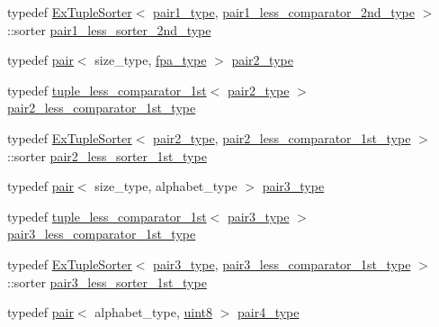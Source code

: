 \begin{DoxyCompactItemize}
\item 
typedef \hyperlink{struct_ex_tuple_sorter}{Ex\+Tuple\+Sorter}$<$ \hyperlink{class_validate4_aaa2fcb80a05115eb4ca02ab23df8827e}{pair1\+\_\+type}, \hyperlink{class_validate4_a67166f1b6f64e5d8887d9a5aa6072346}{pair1\+\_\+less\+\_\+comparator\+\_\+2nd\+\_\+type} $>$\+::sorter \hyperlink{class_validate4_a65355c8a8ccca4870060305479e7748c}{pair1\+\_\+less\+\_\+sorter\+\_\+2nd\+\_\+type}
\item 
typedef \hyperlink{structpair}{pair}$<$ size\+\_\+type, \hyperlink{common_8h_a7fdaf8b9b3d2f6ae6b10597a8d3f96ee}{fpa\+\_\+type} $>$ \hyperlink{class_validate4_a655c0013e7d26a0653ab8f4f96145bad}{pair2\+\_\+type}
\item 
typedef \hyperlink{structtuple__less__comparator__1st}{tuple\+\_\+less\+\_\+comparator\+\_\+1st}$<$ \hyperlink{class_validate4_a655c0013e7d26a0653ab8f4f96145bad}{pair2\+\_\+type} $>$ \hyperlink{class_validate4_af39ac6db5faa77a64ab49a75f92337a3}{pair2\+\_\+less\+\_\+comparator\+\_\+1st\+\_\+type}
\item 
typedef \hyperlink{struct_ex_tuple_sorter}{Ex\+Tuple\+Sorter}$<$ \hyperlink{class_validate4_a655c0013e7d26a0653ab8f4f96145bad}{pair2\+\_\+type}, \hyperlink{class_validate4_af39ac6db5faa77a64ab49a75f92337a3}{pair2\+\_\+less\+\_\+comparator\+\_\+1st\+\_\+type} $>$\+::sorter \hyperlink{class_validate4_ad945003027abfd152a0e177d7541580d}{pair2\+\_\+less\+\_\+sorter\+\_\+1st\+\_\+type}
\item 
typedef \hyperlink{structpair}{pair}$<$ size\+\_\+type, alphabet\+\_\+type $>$ \hyperlink{class_validate4_ac023757abc671597cf81dcc2d70b1ab1}{pair3\+\_\+type}
\item 
typedef \hyperlink{structtuple__less__comparator__1st}{tuple\+\_\+less\+\_\+comparator\+\_\+1st}$<$ \hyperlink{class_validate4_ac023757abc671597cf81dcc2d70b1ab1}{pair3\+\_\+type} $>$ \hyperlink{class_validate4_a12c8c95c3ef8bf9f3521b439454c5aa0}{pair3\+\_\+less\+\_\+comparator\+\_\+1st\+\_\+type}
\item 
typedef \hyperlink{struct_ex_tuple_sorter}{Ex\+Tuple\+Sorter}$<$ \hyperlink{class_validate4_ac023757abc671597cf81dcc2d70b1ab1}{pair3\+\_\+type}, \hyperlink{class_validate4_a12c8c95c3ef8bf9f3521b439454c5aa0}{pair3\+\_\+less\+\_\+comparator\+\_\+1st\+\_\+type} $>$\+::sorter \hyperlink{class_validate4_aff3135d55f749682df7e0f97c82a6769}{pair3\+\_\+less\+\_\+sorter\+\_\+1st\+\_\+type}
\item 
typedef \hyperlink{structpair}{pair}$<$ alphabet\+\_\+type, \hyperlink{types_8h_a115946cb5fc5879545e9ccea096a6031}{uint8} $>$ \hyperlink{class_validate4_a8ef701022ecc2f0ffc1eae0e71e0aaf7}{pair4\+\_\+type}

\end{DoxyCompactItemize}
